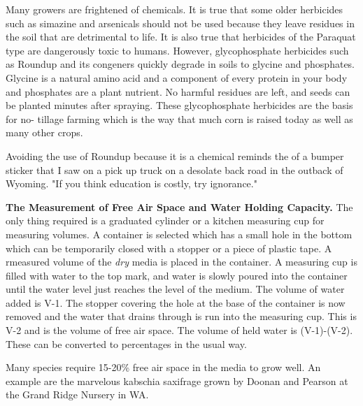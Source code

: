 Many growers are frightened of chemicals. It is true that some older herbicides
such as simazine and arsenicals should not be used because they leave residues in
the soil that are detrimental to life. It is also true that herbicides of the Paraquat type
are dangerously toxic to humans. However, glycophosphate herbicides such as
Roundup and its congeners quickly degrade in soils to glycine and phosphates.
Glycine is a natural amino acid and a component of every protein in your body and
phosphates are a plant nutrient. No harmful residues are left, and seeds can be
planted minutes after spraying. These glycophosphate herbicides are the basis for no-
tillage farming which is the way that much corn is raised today as well as many other
crops.

Avoiding the use of Roundup because it is a chemical reminds the of a bumper
sticker that I saw on a pick up truck on a desolate back road in the outback of
Wyoming. "If you think education is costly, try ignorance."

\textbf{The Measurement of Free Air Space and Water Holding Capacity.}
The only thing required is a graduated cylinder or a kitchen measuring cup for
measuring volumes. A container is selected which has a small hole in the bottom
which can be temporarily closed with a stopper or a piece of plastic tape. A
rmeasured volume of the \textit{dry} media is placed in the container. A measuring cup is
filled with water to the top mark, and water is slowly poured into the container until the
water level just reaches the level of the medium. The volume of water added is
V-1. The stopper covering the hole at the base of the container is now removed and
the water that drains through is run into the measuring cup. This is V-2 and is the
volume of free air space. The volume of held water is (V-1)-(V-2). These can be
converted to percentages in the usual way.

Many species require 15-20\% free air space in the media to grow well. An
example are the marvelous kabschia saxifrage grown by Doonan and Pearson at the
Grand Ridge Nursery in WA.

